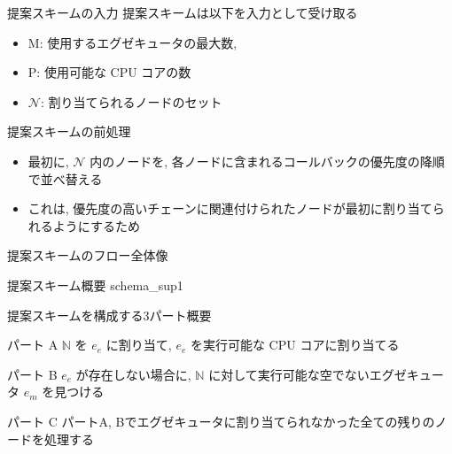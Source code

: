 \begin{frame}{提案スキームの入力}
    提案スキームは以下を入力として受け取る
    \begin{itemize}
        \item $\mathrm{M}$: 使用するエグゼキュータの最大数,
        \item $\mathrm{P}$: 使用可能な CPU コアの数
        \item $\mathcal{N}$: 割り当てられるノードのセット
    \end{itemize}
\end{frame}

\begin{frame}{提案スキームの前処理}
    \begin{itemize}
        \item 最初に, $\mathcal{N}$ 内のノードを, 各ノードに含まれるコールバックの優先度の降順で並べ替える
        \item これは, 優先度の高いチェーンに関連付けられたノードが最初に割り当てられるようにするため
    \end{itemize}
\end{frame}

\begin{frame}{提案スキームのフロー全体像}
\end{frame}

\begin{frame}{提案スキーム概要}
    {schema_sup1}
\end{frame}

\begin{frame}{提案スキームを構成する3パート概要}
    \begin{block}{パート A}
        $\mathbb{N}$ を $e_{e}$ に割り当て, $e_{e}$ を実行可能な CPU コアに割り当てる
    \end{block}
    \begin{block}{パート B}
        $e_{e}$ が存在しない場合に, $\mathbb{N}$ に対して実行可能な空でないエグゼキュータ $e_{m}$ を見つける
    \end{block}
    \begin{block}{パート C}
        パートA, Bでエグゼキュータに割り当てられなかった全ての残りのノードを処理する
    \end{block}
\end{frame}


